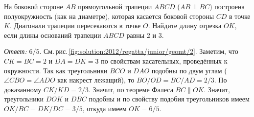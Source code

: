 На боковой стороне $AB$ прямоугольной трапеции $ABCD$ ($AB \perp BC$)
построена полуокружность (как на диаметре), которая касается боковой стороны
$CD$ в точке $K$.
Диагонали трапеции пересекаются в точке $O$.
Найдите длину отрезка $OK$, если длины оснований трапеции $ABCD$ равны 2 и 3.

%
\label{solution:2012/regatta/junior/geomt/2}%
\emph{Ответ:} $6 / 5$.
См.\,рис.\,\ref{fig:solution:2012/regatta/junior/geomt/2}.
Заметим, что $CK = BC = 2$ и $DA = DK = 3$ по свойствам касательных,
проведённых к окружности.
Так как треугольники $BCO$ и $DAO$ подобны по двум углам
($\angle CBO = \angle ADO$ как накрест лежащий),
то $BO / OD = BC / AD = 2 / 3$.
По доказанному $CK / KD = 2 / 3$.
Значит, по теореме Фалеса $BC \parallel OK$.
Значит, треугольники $DOK$ и $DBC$ подобны и по свойству подобия треугольников
имеем $OK / BC = DK / DC = 3 / 5$, откуда имеем $OK = 6 / 5$.

